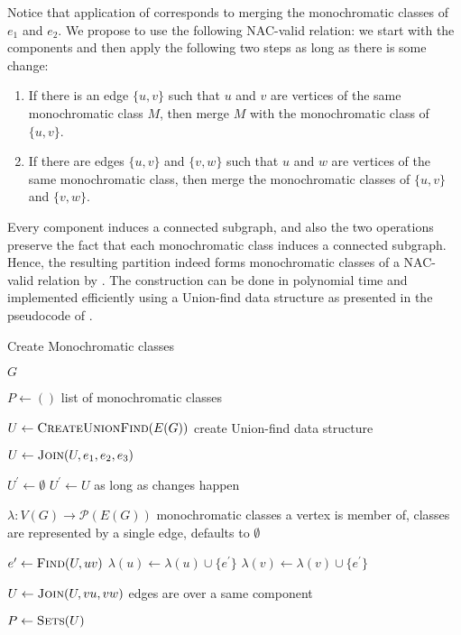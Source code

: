 Notice that application of  corresponds
to merging the monochromatic classes of $e_1$ and $e_2$.
We propose to use the following NAC-valid relation:
we start with the \trcon{} components and then apply the following two steps
as long as there is some change:
%
\begin{enumerate}
	\item If there is an edge \( \{u, v\} \) such that $u$ and $v$ are vertices of
	      the same monochromatic class $M$, then merge $M$ with the monochromatic class of \( \{u, v\} \).
	\item If there are edges \( \{u, v\} \) and \( \{v, w\} \) such that $u$ and $w$ are vertices of
	      the same monochromatic class, then merge the monochromatic classes of \( \{u, v\} \) and \( \{v, w\} \).
\end{enumerate}
%
Every \trcon{} component induces a connected subgraph, and also the two operations preserve
the fact that each monochromatic class induces a connected subgraph.
Hence, the resulting partition indeed forms monochromatic classes
of a NAC-valid relation by .
The construction can be done in polynomial time
and implemented efficiently using a Union-find data structure
as presented in the pseudocode of .

\begin{algorithm}
	\caption{Create Monochromatic classes~\cite{my_paper}}%
	\label{alg:create_monochromatic classes}
	\begin{algorithmic}[1]
		\Require{} $G$

		\Ensure{} $P \gets ()$
		\Comment{} list of monochromatic classes

		\State{} $U \gets \Call{CreateUnionFind}{E(G)}$
		\Comment{} create Union-find data structure

		\State{} $U \gets \Call{Join}{U, e_{1}, e_{2}, e_{3}}$
		\EndFor{}

		\State{} $U^\prime \gets \emptyset$
		\State{} $U^\prime \gets U$
		\Comment{} as long as changes happen

		\State{} $\lambda : V(G) \to \mathcal{P}(E(G))$
		\Comment{} monochromatic classes a vertex is member of,
		\State{}
		\Comment{} classes are represented by a single edge, defaults to $\emptyset$

		\State{} $e^\prime \gets \Call{Find}{U, uv}$
		\State{} $\lambda(u) \gets \lambda(u) \cup \{e^\prime\}$
		\State{} $\lambda(v) \gets \lambda(v) \cup \{e^\prime\}$
		\EndFor{}

		\State{} $U \gets \Call{Join}{U, vu, vw}$
		\Comment{} edges are over a same component
		\EndIf{}
		\EndFor{}
		\EndWhile{}

		\State{} $P \gets \Call{Sets}{U}$

	\end{algorithmic}
\end{algorithm}

